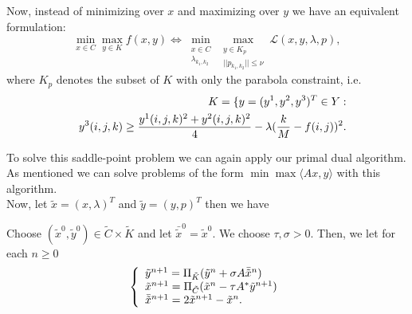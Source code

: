             Now, instead of minimizing over $x$ and maximizing over $y$ we have an equivalent formulation:
                \begin{equation}
                    \min_{x \in C} \max_{y \in K} f(x, y) \Longleftrightarrow \min_{\substack{x \in C \\ \lambda_{k_{1}, k_{2}}}} \max_{\substack{y \in K_{p} \\ ||p_{k_{1}, k_{2}}|| \le \nu}} \mathcal{L} (x, y, \lambda, p),
                \end{equation}
            where $K_{p}$ denotes the subset of $K$ with only the parabola constraint, i.e.
                \begin{eqnarray}
                    &&K = \{ y = (y^{1}, y^{2}, y^{3})^{T} \in Y: \notag \\
                    &&y^{3}(i,j,k) \ge \frac{y^{1}(i,j,k)^{2} + y^{2}(i,j,k)^{2}}{4} - \lambda(\frac{k}{M} - f(i,j))^{2}.
                \end{eqnarray}

            To solve this saddle-point problem we can again apply our primal dual algorithm. As mentioned we can solve problems of the form $\min \max \langle Ax, y \rangle$ with this algorithm. \\
            Now, let $\tilde{x} = (x, \lambda)^{T}$ and $\tilde{y} = (y, p)^{T}$ then we have
                    \begin{algorithm}
                        Choose $(\tilde{x}^{0}, \tilde{y}^{0}) \in \tilde{C} \times \tilde{K}$ and let $\bar{\tilde{x}}^{0} = \tilde{x}^{0}$. We choose $\tau, \sigma > 0$. Then, we let for each $n \ge 0$
                            \begin{equation}
                                \left\{ 
                                    \begin{array}{l l}
                                      \tilde{y}^{n+1} = \Pi_{\tilde{K}} (\tilde{y}^{n} + \sigma A \bar{\tilde{x}}^{n}) \\
                                      \tilde{x}^{n+1} = \Pi_{\tilde{C}} (\tilde{x}^{n} - \tau A^{*} \tilde{y}^{n+1}) \\
                                      \bar{\tilde{x}}^{n+1} = 2\tilde{x}^{n+1} - \tilde{x}^{n}.
                                    \end{array}
                                \right.
                            \end{equation}
                    \end{algorithm}

